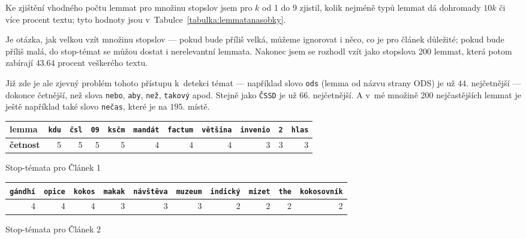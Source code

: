 \documentclass[12pt,a4paper]{report}
\begin{document}
Ke zjištění vhodného počtu lemmat pro množinu stopslov jsem pro $k$ od 1 do 9 zjistil, kolik nejméně typů lemmat dá dohromady $10k$ či více procent textu; tyto hodnoty jsou v~Tabulce~\ref{tabulka:lemmatanasobky}.

Je otázka, jak velkou vzít množinu stopslov --- pokud bude příliš velká, můžeme ignorovat i něco, co je pro článek důležité; pokud bude příliš malá, do stop-témat se můžou dostat i nerelevantní lemmata. Nakonec jsem se rozhodl vzít jako stopslova 200 lemmat, která potom zabírají $43.64$ procent veškerého textu.

Již zde je ale zjevný problém tohoto přístupu k~detekci témat --- například slovo \texttt{ods} (lemma od názvu strany ODS) je už $44.$ nejčetnější --- dokonce četnější, než slova \texttt{nebo}, \texttt{aby}, \texttt{než}, \texttt{takový} apod. Stejně jako \texttt{ČSSD} je už $66.$ nejčetnější. A v~mé množině 200 nejčastějších lemmat je ještě například také slovo \texttt{nečas}, které je na $195.$ místě.


{
    \begin{tabular}{ |l | r |r |r |r |r |r |r |r |r |r | }
        \hline
        \textbf{lemma} & 
        \texttt{kdu} & 
        \texttt{čsl} & 
        \texttt{09} & 
        \texttt{ksčm} & 
        \texttt{mandát} &
        \texttt{factum} & 
        \texttt{většina} & 
        \texttt{invenio} & 
        \texttt{2} & 
        \texttt{hlas} \\ \hline
        
        \textbf{četnost}  & 5 & 5 & 5 & 5 & 4 & 4 & 4 & 3 & 3 & 3 \\ \hline
        
        
      \end{tabular}

}{Stop-témata pro Článek 1}


{
    \begin{tabular}{ | r |r |r |r |r |r |r |r |r |r | }
        \hline
        \texttt{gándhí} & 
        \texttt{opice} & 
        \texttt{kokos} & 
        \texttt{makak} & 
        \texttt{návštěva} & 
        \texttt{muzeum} &
        \texttt{indický} &
        \texttt{mizet} & 
        \texttt{the} & 
        \texttt{kokosovník} \\ \hline
        
        
        4  & 4  & 4  & 3 & 3 & 3  & 2 & 2 & 2 & 2 \\ \hline
      \end{tabular}


}{Stop-témata pro Článek 2}
\end{document}
